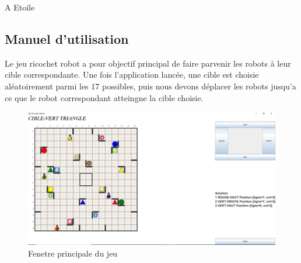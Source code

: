 \documentclass[12pt]{article}
\begin{document}
		\newpage
		\begin{algorithm}
			
			\caption{A Etoile}
			
		\end{algorithm}
		
		
		\subsection{Manuel d'utilisation }  
			Le jeu ricochet robot a pour objectif principal de faire parvenir les robots à leur cible correspondante.
			Une fois l'application lancée, une cible est choisie aléatoirement parmi les 17 possibles, puis nous devons déplacer les robots jusqu'a ce que le robot correspondant atteingne la cible  choisie.
			
		\newpage
			\begin{figure}[htpb]
			\includegraphics[scale=0.4]{./images/g.png}
			\caption{Fenetre principale du jeu}
			\end{figure}
			
\end{document}
